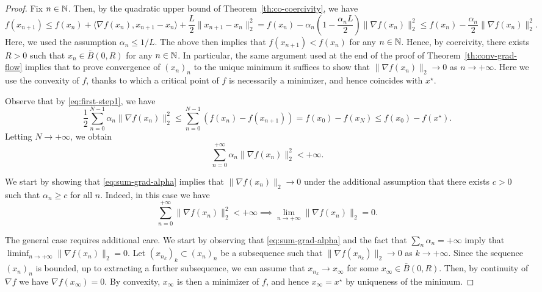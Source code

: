      \begin{proof}
         Fix $n\in\mathbb{N}$.
         Then, by the quadratic upper bound of Theorem~\ref{th:co-coercivity}, we have
         \begin{equation}
             \label{eq:first-step1}
             f(x_{n+1})
             \le f(x_n) + \langle \nabla f(x_n), x_{n+1}-x_n \rangle+\frac{L}2\|x_{n+1}-x_n\|_2^2
             = f(x_n)-\alpha_n \left(1-\frac{\alpha_n L}2\right) \|\nabla f(x_n)\|_2^2
             \le f(x_n) - \frac{\alpha_n}2 \|\nabla f(x_n)\|_2^2.
         \end{equation}
        Here, we used the assumption $\alpha_n\le 1/L$. The above then implies that $f(x_{n+1})<f(x_n)$ for any $n\in \mathbb{N}$. Hence, by coercivity, there exists $R>0$ such that $x_n\in \bar B(0,R)$ for any $n\in \mathbb{N}$.
        In particular, the same argument used at the end of the proof of Theorem~\ref{th:conv-grad-flow} implies that to prove convergence of $(x_n)_n$ to the unique minimum it suffices to show that $\|\nabla f(x_n)\|_2 \rightarrow 0$ as $n \to +\infty$. Here we use the convexity of $f$, thanks to which a critical point of $f$ is necessarily a minimizer, and hence coincides with $x^\star$.
        
        Observe that by \eqref{eq:first-step1}, we have
         \begin{equation}
            \frac12 \sum_{n=0}^{N-1} \alpha_n \|\nabla f(x_n)\|_2^2 \le \sum_{n=0}^{N-1} \left(f(x_{n})-f(x_{n+1})\right) =f(x_0) - f(x_N) \le f(x_0)-f(x^\star).
        \end{equation}
        Letting $N\to +\infty$, we obtain
        \begin{equation}
            \label{eq:sum-grad-alpha}
             \sum_{n=0}^{+\infty} \alpha_n \|\nabla f(x_n)\|_2^2 < +\infty.
         \end{equation}
 
        We start by showing that \eqref{eq:sum-grad-alpha} implies that $\|\nabla f(x_n)\|_2 \rightarrow 0$ under the additional assumption that there exists $c>0$ such that $\alpha_n \ge c$ for all $n$. 
         Indeed, in this case we have
         \begin{equation}
             \sum_{n=0}^{+\infty}  \|\nabla f(x_n)\|_2^2 <+\infty \implies \lim_{n\to +\infty} \|\nabla f(x_n)\|_2 =0.
         \end{equation}

        The general case requires additional care.
        We start by observing that \eqref{eq:sum-grad-alpha} and the fact that $\sum_n\alpha_n=+\infty$ imply that $\liminf_{n\to +\infty} \|\nabla f(x_n)\|_2 =0$. Let $(x_{n_k})_k\subset (x_n)_n$ be a subsequence such that $\|\nabla f(x_{n_k})\|_2 \rightarrow 0$ as $k\to +\infty$.
        Since the sequence $(x_n)_n$ is bounded, up to extracting a further subsequence, we can assume that $x_{n_k}\rightarrow x_\infty$ for some $x_\infty\in \bar B(0,R)$. Then, by continuity of $\nabla f$ we have $\nabla f(x_\infty) =0$. By convexity, $x_\infty$ is then a minimizer of $f$, and hence $x_\infty = x^\star$ by uniqueness of the minimum.


\end{proof}
